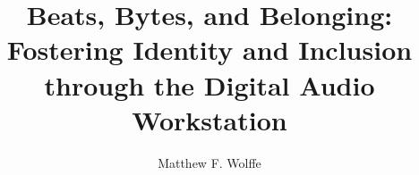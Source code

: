 \documentclass[manuscript,screen,review]{acmart}
\begin{document}
\title{Beats, Bytes, and Belonging: Fostering Identity and Inclusion through the Digital Audio Workstation}

\author{Matthew F. Wolffe}

\end{document}
